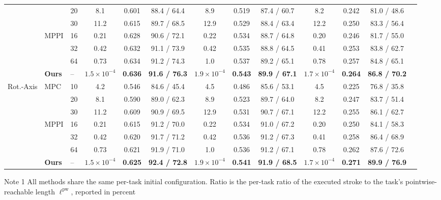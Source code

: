 \documentclass[journal, twoside]{IEEEtran}
\begin{document}
\begin{table}[!htbp]
\begin{threeparttable}
\begin{tabular}{lllcccccccccc}
  &   & 20 & 8.1 & 0.601 & 88.4 / 64.4 & 8.9 & 0.519 & 87.4 / 60.7 & 8.2 & 0.242 & 81.0 / 48.6 \\
  &   & 30 & 11.2 & 0.615 & 89.7 / 68.5 & 12.9 & 0.529 & 88.4 / 63.4 & 12.2 & 0.250 & 83.3 / 56.4 \\
\cmidrule(lr){2-12}
  & \multirow{3}{*}{MPPI} & 16 & 0.21 & 0.628 & 90.6 / 72.1 & 0.22 & 0.534 & 88.7 / 64.8 & 0.20 & 0.246 & 81.7 / 55.0 \\
  &   & 32 & 0.42 & 0.632 & 91.1 / 73.9 & 0.42 & 0.535 & 88.8 / 64.5 & 0.41 & 0.253 & 83.8 / 62.7 \\
  &   & 64 & 0.73 & 0.634 & 91.2 / 74.3 & 1.0 & 0.537 & 89.2 / 65.1 & 0.78 & 0.257 & 84.8 / 65.1 \\
\cmidrule(lr){2-12}
 & \textbf{Ours} & -- & \textbf{$1.5\times10^{-4}$} & \textbf{0.636} & \textbf{91.6 / 76.3} & \textbf{$1.9\times10^{-4}$} & \textbf{0.543} & \textbf{89.9 / 67.1} & \textbf{$1.7\times10^{-4}$} & \textbf{0.264} & \textbf{86.8 / 70.2} \\
\midrule
\multirow{7}{*}{Rot.-Axis} & \multirow{3}{*}{MPC} & 10 & 4.2 & 0.546 & 84.6 / 45.4 & 4.5 & 0.486 & 85.6 / 53.1 & 4.5 & 0.225 & 76.8 / 35.8 \\
  &   & 20 & 8.1 & 0.590 & 89.0 / 62.3 & 8.9 & 0.523 & 89.7 / 64.0 & 8.2 & 0.247 & 83.7 / 51.4 \\
  &   & 30 & 11.2 & 0.609 & 90.9 / 69.5 & 12.9 & 0.531 & 90.7 / 67.1 & 12.2 & 0.255 & 86.1 / 62.7 \\
\cmidrule(lr){2-12}
  & \multirow{3}{*}{MPPI} & 16 & 0.21 & 0.615 & 91.2 / 70.0 & 0.22 & 0.534 & 91.0 / 67.2 & 0.20 & 0.250 & 84.1 / 58.3 \\
  &   & 32 & 0.42 & 0.620 & 91.7 / 71.2 & 0.42 & 0.536 & 91.2 / 67.3 & 0.41 & 0.258 & 86.4 / 68.9 \\
  &   & 64 & 0.73 & 0.621 & 91.9 / 71.0 & 1.0 & 0.536 & 91.2 / 67.1 & 0.78 & 0.262 & 87.6 / 72.6 \\
\cmidrule(lr){2-12}
 & \textbf{Ours} & -- & \textbf{$1.5\times10^{-4}$} & \textbf{0.625} & \textbf{92.4 / 72.8} & \textbf{$1.9\times10^{-4}$} & \textbf{0.541} & \textbf{91.9 / 68.5} & \textbf{$1.7\times10^{-4}$} & \textbf{0.271} & \textbf{89.9 / 76.9} \\
\bottomrule
\end{tabular}
\begin{tablenotes}
    \item[Note 1] All methods share the same per-task initial configuration.
    Ratio is the per-task ratio of the executed stroke to the task's
    pointwise-reachable length $\ell^{\mathrm{pw}}$, reported in percent

\end{tablenotes}
\end{threeparttable}
\end{table}
\end{document}
